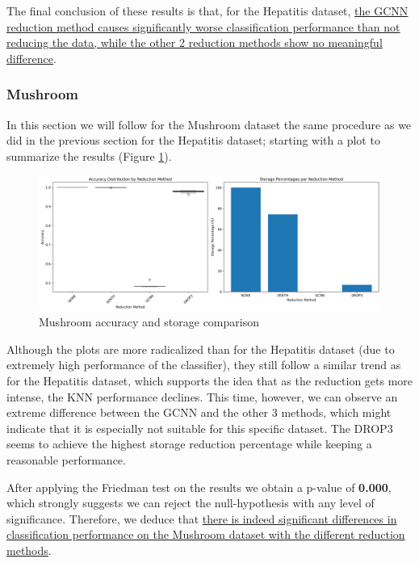 The final conclusion of these results is that, for the Hepatitis dataset, \uline{the GCNN reduction method causes significantly worse classification performance than not reducing the data, while the other 2 reduction methods show no meaningful difference}.

\subsubsection{Mushroom}
In this section we will follow for the Mushroom dataset the same procedure as we did in the previous section for the Hepatitis dataset; starting with a plot to summarize the results (Figure \ref{fig:mush:reduction}).
\begin{figure}[H]
    \centering
    \includegraphics[width=\textwidth]{figures/knn/mushroom/accuracy_storage_comparison.png}
    \caption{Mushroom accuracy and storage comparison}
    \label{fig:mush:reduction}
\end{figure}

Although the plots are more radicalized than for the Hepatitis dataset (due to extremely high performance of the classifier), they still follow a similar trend as for the Hepatitis dataset, which supports the idea that as the reduction gets more intense, the KNN performance declines. This time, however, we can observe an extreme difference between the GCNN and the other 3 methods, which might indicate that it is especially not suitable for this specific dataset. The DROP3 seems to achieve the highest storage reduction percentage while keeping a reasonable performance.

After applying the Friedman test on the results we obtain a p-value of \textbf{0.000}, which strongly suggests we can reject the null-hypothesis with any level of significance. Therefore, we deduce that \uline{there is indeed significant differences in classification performance on the Mushroom dataset with the different reduction methods}.

